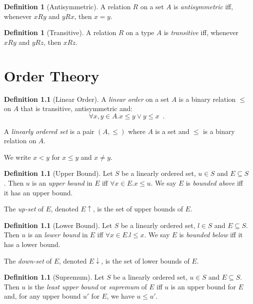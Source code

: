 \documentclass{book}
\theoremstyle{definition}
\newtheorem{df}[prop]{Definition}
\begin{document}
\begin{df}[Antisymmetric]
A relation $R$ on a set $A$ is \emph{antisymmetric} iff, whenever $xRy$ and $yRx$, then $x = y$.
\end{df}

\begin{df}[Transitive]
A relation $R$ on a type $A$ is \emph{transitive} iff, whenever $xRy$ and $yRz$, then $xRz$.
\end{df}

\chapter{Order Theory}

\begin{df}[Linear Order]
A \emph{linear order} on a set $A$ is a binary relation $\leq$ on $A$ that is transitive, antisymmetric and:
\[ \forall x,y \in A. x \leq y \vee y \leq x \enspace . \]

A \emph{linearly ordered set} is a pair $(A, \leq)$ where $A$ is a set and $\leq$ is a binary relation on $A$.

We write $x < y$ for $x \leq y$ and $x \neq y$.
\end{df}

\begin{df}[Upper Bound]
Let $S$ be a linearly ordered set, $u \in S$ and $E \subseteq S$. Then $u$ is an \emph{upper bound} in $E$ iff $\forall x \in E. x \leq u$. We say $E$ is \emph{bounded above} iff it has an upper bound.

The \emph{up-set} of $E$, denoted $E \uparrow$, is the set of upper bounds of $E$.
\end{df}

\begin{df}[Lower Bound]
Let $S$ be a linearly ordered set, $l \in S$ and $E \subseteq S$. Then $u$ is an \emph{lower bound} in $E$ iff $\forall x \in E. l \leq x$. We say $E$ is \emph{bounded below} iff it has a lower bound.

The \emph{down-set} of $E$, denoted $E \downarrow$, is the set of lower bounds of $E$.
\end{df}

\begin{df}[Supremum]
Let $S$ be a linearly ordered set, $u \in S$ and $E \subseteq S$. Then $u$ is the \emph{least upper bound} or \emph{supremum} of $E$ iff $u$ is an upper bound for $E$ and, for any upper bound $u'$ for $E$, we have $u \leq u'$.
\end{df}
\end{document}
